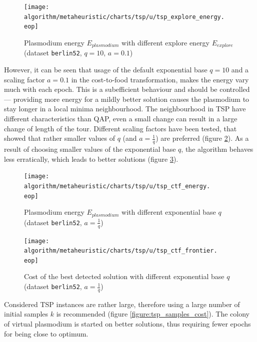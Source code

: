 \documentclass[english,a4paper,twoside]{ppfcmthesis}
\begin{document}
\begin{figure}
  \centering

  \texttt{[image: algorithm/metaheuristic/charts/tsp/u/tsp\_explore\_energy.\\eop]}

  \caption{Plasmodium energy $E_{plasmodium}$ with different explore energy $E_{explore}$ (dataset \texttt{berlin52}, $q=10$, $a=0.1$)}
  \label{figure:tsp_explore_energy}
\end{figure}

However, it can be seen that usage of the default exponential base $q=10$ and a scaling factor $a=0.1$ in the cost-to-food transformation, makes the energy vary much with each epoch. This is a subefficient behaviour and should be controlled --- providing more energy for a mildly better solution causes the plasmodium to stay longer in a local minima neighbourhood. The neighbourhood in TSP have different characteristics than QAP, even a small change can result in a large change of length of the tour. Different scaling factors have been tested, that showed that rather smaller values of $q$ (and $a=\frac{1}{q}$) are preferred (figure \ref{figure:tsp_ctf_energy}). As a result of choosing smaller values of the exponential base $q$, the algorithm behaves less erratically, which leads to better solutions (figure \ref{figure:tsp_ctf_frontier}).

\begin{figure}
  \centering

  \texttt{[image: algorithm/metaheuristic/charts/tsp/u/tsp\_ctf\_energy.\\eop]}

  \caption{Plasmodium energy $E_{plasmodium}$ with different exponential base $q$ (dataset \texttt{berlin52}, $a=\frac{1}{q}$)}
  \label{figure:tsp_ctf_energy}
\end{figure}

\begin{figure}
  \centering

  \texttt{[image: algorithm/metaheuristic/charts/tsp/u/tsp\_ctf\_frontier.\\eop]}

  \caption{Cost of the best detected solution with different exponential base $q$ (dataset \texttt{berlin52}, $a=\frac{1}{q}$)}
  \label{figure:tsp_ctf_frontier}
\end{figure}

Considered TSP instances are rather large, therefore using a large number of initial samples $k$ is recommended (figure \ref{figure:tsp_samples_cost}). The colony of virtual plasmodium is started on better solutions, thus requiring fewer epochs for being close to optimum.
\end{document}
